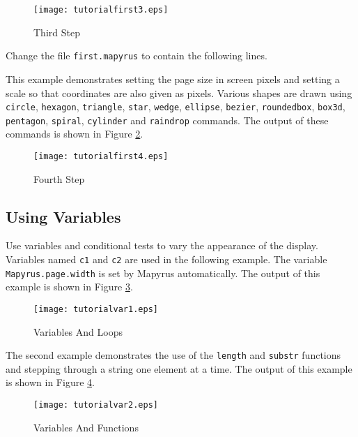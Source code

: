 \begin{figure}[htb]
\texttt{[image: tutorialfirst3.eps]}
\caption{Third Step}
\label{tutorialfirst3}
\end{figure}

Change the file \texttt{first.mapyrus} to contain the following lines.



This example demonstrates setting the page size in
screen pixels and setting a scale so that coordinates
are also given as pixels.
Various shapes
are drawn using \texttt{circle},
\texttt{hexagon}, \texttt{triangle}, \texttt{star},
\texttt{wedge}, \texttt{ellipse}, \texttt{bezier},
\texttt{roundedbox}, \texttt{box3d},
\texttt{pentagon}, \texttt{spiral},
\texttt{cylinder} and \texttt{raindrop}
commands.
The output of these commands is shown in Figure \ref{tutorialfirst4}.

\begin{figure}[htb]
\texttt{[image: tutorialfirst4.eps]}
\caption{Fourth Step}
\label{tutorialfirst4}
\end{figure}

\subsection{Using Variables}

Use variables and conditional tests to vary the appearance
of the display.
Variables named \texttt{c1} and \texttt{c2} are used in the
following example.  The variable
\texttt{Mapyrus.page.width}
is set by Mapyrus automatically.
The output of this example is shown in Figure \ref{tutorialvar1}.



\begin{figure}[htb]
\texttt{[image: tutorialvar1.eps]}
\caption{Variables And Loops}
\label{tutorialvar1}
\end{figure}

The second example demonstrates the use of the
\texttt{length} and \texttt{substr}
functions
and stepping through a string one element at a time.
The output of this example is shown in Figure \ref{tutorialvar2}.



\begin{figure}[htb]
\texttt{[image: tutorialvar2.eps]}
\caption{Variables And Functions}
\label{tutorialvar2}
\end{figure}


